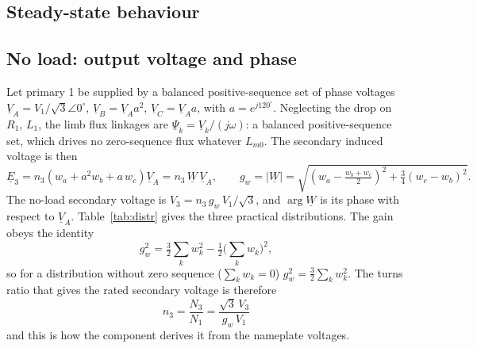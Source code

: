 \documentclass[10pt,a4paper]{scrartcl}
\newcommand{\ph}[1]{\underline{#1}}
\begin{document}
\begin{onehalfspace}
\section{Steady-state behaviour}

\subsection{No load: output voltage and phase}

Let primary 1 be supplied by a balanced positive-sequence set of phase voltages $\ph{V}_A = V_1/\sqrt3\angle0^\circ$, $\ph{V}_B = \ph{V}_A a^2$, $\ph{V}_C = \ph{V}_A a$, with $a = e^{j120^\circ}$. Neglecting the drop on $R_1$, $L_1$, the limb flux linkages are $\ph{\Psi}_k = \ph{V}_k/(j\omega)$: a balanced positive-sequence set, which drives no zero-sequence flux whatever $L_{m0}$. The secondary induced voltage is then
\begin{equation}
\ph{E}_3 = n_3\left(w_a + a^2 w_b + a\,w_c\right)\ph{V}_A = n_3\,\ph{W}\,\ph{V}_A ,
\qquad g_w = |\ph{W}| = \sqrt{\left(w_a - \tfrac{w_b+w_c}{2}\right)^2 + \tfrac34\left(w_c - w_b\right)^2} .
\label{eq:E3}
\end{equation}
The no-load secondary voltage is $V_3 = n_3\,g_w\,V_1/\sqrt3$, and $\arg\ph{W}$ is its phase with respect to $\ph{V}_A$. Table~\ref{tab:distr} gives the three practical distributions. The gain obeys the identity
\begin{equation}
g_w^2 = \tfrac32\sum_k w_k^2 - \tfrac12\Big(\sum_k w_k\Big)^2 ,
\label{eq:gw}
\end{equation}
so for a distribution without zero sequence ($\sum_k w_k=0$) $g_w^2 = \tfrac32\sum_k w_k^2$. The turns ratio that gives the rated secondary voltage is therefore
\begin{equation}
\boxed{\;n_3 = \frac{N_3}{N_1} = \frac{\sqrt3\,V_3}{g_w\,V_1}\;}
\label{eq:n3}
\end{equation}
and this is how the component derives it from the nameplate voltages.


\end{onehalfspace}
\end{document}
